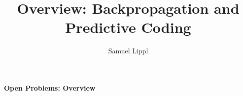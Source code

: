 \documentclass[a4paper,11pt]{article}
\author{Samuel Lippl}
\title{Overview: Backpropagation and Predictive Coding}
\begin{document}
\renewcommand{\abstractname}{\vspace{-\baselineskip}}
\theoremstyle{change} %
\theoremheaderfont{\normalfont\scshape}
\theorembodyfont{\normalfont}
\newtheorem{Def}{Definition}[section]
\newtheorem{The}[Def]{Theorem}
\newtheorem{Lem}[Def]{Lemma}
\newtheorem{Pro}[Def]{Proposition}
\newtheorem{Kor}[Def]{Korollar}
\newtheorem{Bem}[Def]{Remark}
\newtheorem{Not}[Def]{Notation}
\newtheorem{Bei}[Def]{Example}
\newtheorem{Ax}[Def]{Axiom}
\newtheorem{Con}[Def]{Condition}
\newtheorem{Hyp}[Def]{Hypothesis}
\newtheorem{OP}{Open Problem}
\theoremseparator{}
\newtheorem{Abs}[Def]{}
\theoremstyle{nonumberplain}
\theoremheaderfont{\normalfont\itshape}
\theoremsymbol{$\square$}
\newtheorem{Bew}{Proof}
\theoremstyle{change}
\theoremsymbol{}
\theoremheaderfont{\normalfont\scshape}
\newtheorem{BLem}[Def]{Lemma}
\theoremstyle{plain}
\theoremheaderfont{\normalfont\itshape}
\newtheorem{HLem}{Sublemma}[Def]
\newtheorem{BAbs}[HLem]{}
\theoremstyle{nonumberplain}
\theoremheaderfont{\normalfont\itshape}
\theoremsymbol{$\triangle$}
\newtheorem{BBew}{Proof}
\maketitle
\tableofcontents
\textbf{Open Problems: Overview}\\
\end{document}
